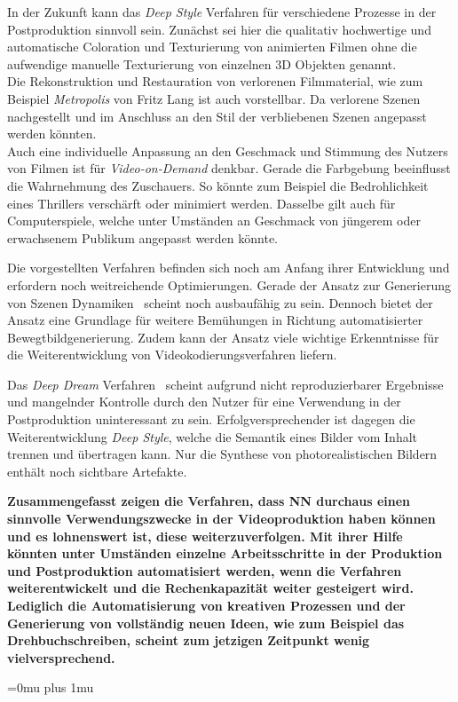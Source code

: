 \documentclass[times, 11pt,twocolumn]{article}
\begin{document}
In der Zukunft kann das \textit{Deep Style} Verfahren für verschiedene Prozesse in der Postproduktion sinnvoll sein. Zunächst sei hier die qualitativ hochwertige und automatische Coloration und Texturierung von animierten Filmen ohne die aufwendige manuelle Texturierung von einzelnen 3D Objekten genannt. \\
Die Rekonstruktion und Restauration von verlorenen Filmmaterial, wie zum Beispiel \textit{Metropolis} von Fritz Lang ist auch vorstellbar. Da verlorene Szenen nachgestellt und im Anschluss an den Stil der verbliebenen Szenen angepasst werden könnten.\\
Auch eine individuelle Anpassung an den Geschmack und Stimmung des Nutzers von Filmen ist für \textit{Video-on-Demand} denkbar. Gerade die Farbgebung beeinflusst die Wahrnehmung des Zuschauers. So könnte zum Beispiel die Bedrohlichkeit eines Thrillers verschärft oder minimiert werden. Dasselbe gilt auch für Computerspiele, welche unter Umständen an Geschmack von jüngerem oder erwachsenem Publikum angepasst werden könnte.

 \label{Fazit}
Die vorgestellten Verfahren befinden sich noch am Anfang ihrer Entwicklung und erfordern noch weitreichende Optimierungen. Gerade der Ansatz zur Generierung von Szenen Dynamiken~\cite{VondrickPT16} scheint noch ausbaufähig zu sein. Dennoch bietet der Ansatz eine Grundlage für weitere Bemühungen in Richtung automatisierter Bewegtbildgenerierung. Zudem kann der Ansatz viele wichtige Erkenntnisse für die Weiterentwicklung von Videokodierungsverfahren liefern.

Das \textit{Deep Dream} Verfahren~\cite{DeepDream} scheint aufgrund nicht reproduzierbarer Ergebnisse und mangelnder Kontrolle durch den Nutzer für eine Verwendung in der Postproduktion uninteressant zu sein. Erfolgversprechender ist dagegen die Weiterentwicklung \textit{Deep Style}, welche die Semantik eines Bilder vom Inhalt trennen und übertragen kann. Nur die Synthese von photorealistischen Bildern enthält noch sichtbare Artefakte.

\textbf{Zusammengefasst zeigen die Verfahren, dass NN durchaus einen sinnvolle Verwendungszwecke in der Videoproduktion haben können und es lohnenswert ist, diese weiterzuverfolgen. Mit ihrer Hilfe könnten unter Umständen einzelne Arbeitsschritte in der Produktion und Postproduktion automatisiert werden, wenn die Verfahren weiterentwickelt und die Rechenkapazität weiter gesteigert wird. Lediglich die Automatisierung von kreativen Prozessen und der Generierung von vollständig neuen Ideen, wie zum Beispiel das Drehbuchschreiben, scheint zum jetzigen Zeitpunkt wenig vielversprechend.}


\newpage
\Urlmuskip=0mu plus 1mu\relax %
 

\end{document}
